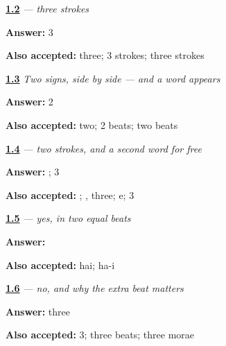 \noindent\begin{minipage}[t]{\linewidth}
\raggedright
\hyperlink{review-JA-W01-ha-strokes}{\textbf{1.2}} \emph{ — three strokes}\par
\small \textbf{Answer:} 3\par
\footnotesize \textbf{Also accepted:} three; 3 strokes; three strokes
\end{minipage}\par\medskip

\noindent\begin{minipage}[t]{\linewidth}
\raggedright
\hyperlink{review-JA-W01-hai-read-beats}{\textbf{1.3}} \emph{Two signs, side by side — and a word appears}\par
\small \textbf{Answer:} 2\par
\footnotesize \textbf{Also accepted:} two; 2 beats; two beats
\end{minipage}\par\medskip

\noindent\begin{minipage}[t]{\linewidth}
\raggedright
\hyperlink{review-JA-W01-e-beats}{\textbf{1.4}} \emph{ — two strokes, and a second word for free}\par
\small \textbf{Answer:} ; 3\par
\footnotesize \textbf{Also accepted:} ; , three; e; 3
\end{minipage}\par\medskip

\noindent\begin{minipage}[t]{\linewidth}
\raggedright
\hyperlink{review-JA-C01-hai-beats}{\textbf{1.5}} \emph{ — yes, in two equal beats}\par
\small \textbf{Answer:} \par
\footnotesize \textbf{Also accepted:} hai; ha-i
\end{minipage}\par\medskip

\noindent\begin{minipage}[t]{\linewidth}
\raggedright
\hyperlink{review-JA-C01-iie-length}{\textbf{1.6}} \emph{ — no, and why the extra beat matters}\par
\small \textbf{Answer:} three\par
\footnotesize \textbf{Also accepted:} 3; three beats; three morae
\end{minipage}\par\medskip

